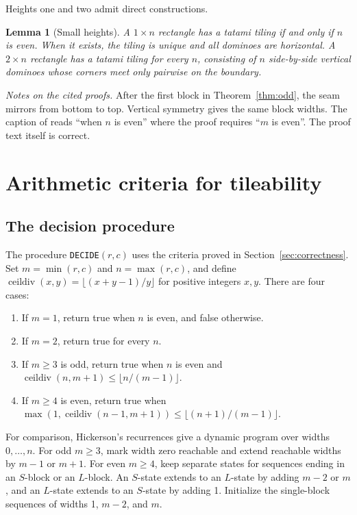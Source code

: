 \documentclass[11pt, reqno]{amsart}
\newtheorem{lemma}[theorem]{Lemma}
\theoremstyle{definition}
\theoremstyle{remark}
\numberwithin{equation}{section}
\begin{document}
Heights one and two admit direct constructions.

\begin{lemma}[Small heights]
    \label{lem:small}
    A $1 \times n$ rectangle has a tatami tiling if and only if $n$ is even.
    When it exists, the tiling is unique and all dominoes are horizontal.
    A $2 \times n$ rectangle has a tatami tiling for
    every $n$, consisting of $n$ side-by-side vertical dominoes whose
    corners meet only pairwise on the boundary.
\end{lemma}

\emph{Notes on the cited proofs.} After the first block in
Theorem~\ref{thm:odd}, the seam mirrors from bottom to top. Vertical
symmetry gives the same block widths. The caption of \cite[Figure~11]{ruskey}
reads ``when $n$ is even'' where the proof requires
``$m$ is even''. The proof text itself is correct.

\section{Arithmetic criteria for tileability}
\label{sec:criteria}

\subsection{The decision procedure}
\label{sec:decision}

The procedure \texttt{DECIDE}$(r,c)$ uses the criteria proved in
Section~\ref{sec:correctness}. Set $m=\min(r,c)$ and $n=\max(r,c)$, and define
$\operatorname{ceildiv}(x,y)=\lfloor(x+y-1)/y\rfloor$ for positive
integers $x,y$. There are four cases:
\begin{enumerate}
    \item If $m = 1$, return true when $n$ is even, and false otherwise.
    \item If $m = 2$, return true for every $n$.
    \item If $m \ge 3$ is odd, return true when $n$ is even and
          $\operatorname{ceildiv}(n, m+1) \le \lfloor n / (m-1) \rfloor$.
    \item If $m \ge 4$ is even, return true when
          $\max(1, \operatorname{ceildiv}(n-1, m+1)) \le \lfloor (n+1) / (m-1) \rfloor$.
\end{enumerate}

For comparison, Hickerson's recurrences \cite{hickerson} give a dynamic
program over widths $0,\dots,n$. For odd $m\ge3$, mark width zero
reachable and extend reachable widths by $m-1$ or $m+1$. For even
$m\ge4$, keep separate states for sequences ending in an $S$-block or
an $L$-block. An $S$-state extends to an $L$-state by adding $m-2$ or
$m$, and an $L$-state extends to an $S$-state by adding 1. Initialize
the single-block sequences of widths 1, $m-2$, and $m$.
\end{document}

